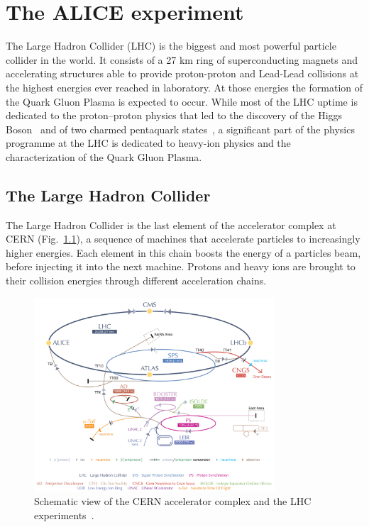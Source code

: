 %
\chapter{The ALICE experiment}
\label{sec:3}


The Large Hadron Collider (LHC) is the biggest and most powerful particle collider in the world.
It consists of a 27 km ring of superconducting magnets and accelerating structures able to
provide proton-proton and Lead-Lead collisions at the highest energies ever reached in laboratory.
At those energies the formation of the Quark Gluon Plasma is expected to occur.
While most of the LHC uptime is dedicated to the proton–proton physics that led to the discovery of 
the Higgs Boson~\cite{atlashiggs,cmshiggs} and of two charmed pentaquark states~\cite{lhcbpenta}, 
a significant part of the physics programme at the LHC is dedicated to heavy-ion physics and the 
characterization of the Quark Gluon Plasma.

\section{The Large Hadron Collider} \label{sec:3.1}

The Large Hadron Collider is the last element of the accelerator complex at CERN 
(Fig.~\ref{fig:lhc}), a sequence of machines that accelerate particles to increasingly higher
energies.
Each element in this chain boosts the energy of a particles beam, before injecting it into the next
machine. Protons and heavy ions are brought to their collision energies through different
acceleration chains.

\begin{figure}
    \centering
    \includegraphics[width=0.8\textwidth]{gfx/lhc}
	\caption{Schematic view of the CERN accelerator complex and the LHC experiments~\cite{lhc}.}
	\label{fig:lhc}
\end{figure}


